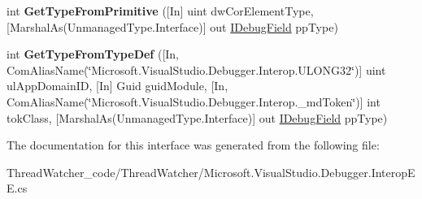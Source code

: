 \begin{DoxyCompactItemize}
\item 
\hypertarget{interface_microsoft_1_1_visual_studio_1_1_debugger_1_1_interop_e_e_1_1_i_debug_dynamic_field_c_o_m_plus_a486c0b670ffbc81deb2a0b302acb4b12}{int {\bfseries Get\+Type\+From\+Primitive} (\mbox{[}In\mbox{]} uint dw\+Cor\+Element\+Type, \mbox{[}Marshal\+As(Unmanaged\+Type.\+Interface)\mbox{]} out \hyperlink{interface_microsoft_1_1_visual_studio_1_1_debugger_1_1_interop_e_e_1_1_i_debug_field}{I\+Debug\+Field} pp\+Type)}\label{interface_microsoft_1_1_visual_studio_1_1_debugger_1_1_interop_e_e_1_1_i_debug_dynamic_field_c_o_m_plus_a486c0b670ffbc81deb2a0b302acb4b12}

\item 
\hypertarget{interface_microsoft_1_1_visual_studio_1_1_debugger_1_1_interop_e_e_1_1_i_debug_dynamic_field_c_o_m_plus_a6ec1f56e1f52b6fcfb83b27d4d91976a}{int {\bfseries Get\+Type\+From\+Type\+Def} (\mbox{[}In, Com\+Alias\+Name(\char`\"{}Microsoft.\+Visual\+Studio.\+Debugger.\+Interop.\+U\+L\+O\+N\+G32\char`\"{})\mbox{]} uint ul\+App\+Domain\+I\+D, \mbox{[}In\mbox{]} Guid guid\+Module, \mbox{[}In, Com\+Alias\+Name(\char`\"{}Microsoft.\+Visual\+Studio.\+Debugger.\+Interop.\+\_\+md\+Token\char`\"{})\mbox{]} int tok\+Class, \mbox{[}Marshal\+As(Unmanaged\+Type.\+Interface)\mbox{]} out \hyperlink{interface_microsoft_1_1_visual_studio_1_1_debugger_1_1_interop_e_e_1_1_i_debug_field}{I\+Debug\+Field} pp\+Type)}\label{interface_microsoft_1_1_visual_studio_1_1_debugger_1_1_interop_e_e_1_1_i_debug_dynamic_field_c_o_m_plus_a6ec1f56e1f52b6fcfb83b27d4d91976a}

\end{DoxyCompactItemize}


The documentation for this interface was generated from the following file\+:\begin{DoxyCompactItemize}
\item 
Thread\+Watcher\+\_\+code/\+Thread\+Watcher/Microsoft.\+Visual\+Studio.\+Debugger.\+Interop\+E\+E.\+cs\end{DoxyCompactItemize}

